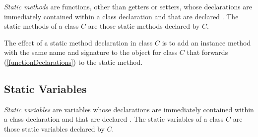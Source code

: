 \documentclass{article}
\begin{document}
\LMHash{}
{\em Static methods} are functions, other than getters or setters, whose declarations are immediately contained within a class declaration and that are declared \STATIC{}.
The static methods of a class $C$ are those static methods declared by $C$.

\LMHash{}
The effect of a static method declaration in class $C$ is to add an instance method with the same name and signature to the  object for class $C$ that forwards (\ref{functionDeclarations}) to the static method.




\subsection{Static Variables}

\LMHash{}
{\em Static variables} are variables whose declarations are immediately contained within a class declaration and that are declared \STATIC{}.
The static variables of a class $C$ are those static variables declared by $C$.




\end{document}
